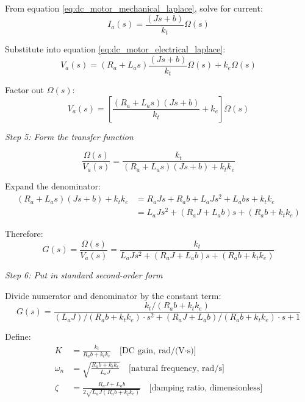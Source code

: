 \begin{example}
From equation \eqref{eq:dc_motor_mechanical_laplace}, solve for current:
\begin{equation}
I_a(s) = \frac{(Js + b)}{k_t} \Omega(s)
\end{equation}

Substitute into equation \eqref{eq:dc_motor_electrical_laplace}:
\begin{equation}
V_a(s) = (R_a + L_a s) \frac{(Js + b)}{k_t} \Omega(s) + k_e \Omega(s)
\end{equation}

Factor out $\Omega(s)$:
\begin{equation}
V_a(s) = \left[\frac{(R_a + L_a s)(Js + b)}{k_t} + k_e\right] \Omega(s)
\end{equation}

\textit{Step 5: Form the transfer function}

\begin{equation}
\frac{\Omega(s)}{V_a(s)} = \frac{k_t}{(R_a + L_a s)(Js + b) + k_t k_e}
\end{equation}

Expand the denominator:
\begin{align}
(R_a + L_a s)(Js + b) + k_t k_e &= R_a J s + R_a b + L_a J s^2 + L_a b s + k_t k_e \\
&= L_a J s^2 + (R_a J + L_a b)s + (R_a b + k_t k_e)
\end{align}

Therefore:
\begin{equation}
G(s) = \frac{\Omega(s)}{V_a(s)} = \frac{k_t}{L_a J s^2 + (R_a J + L_a b)s + (R_a b + k_t k_e)}
\end{equation}

\textit{Step 6: Put in standard second-order form}

Divide numerator and denominator by the constant term:
\begin{equation}
G(s) = \frac{k_t/(R_a b + k_t k_e)}{(L_a J)/(R_a b + k_t k_e) \cdot s^2 + (R_a J + L_a b)/(R_a b + k_t k_e) \cdot s + 1}
\end{equation}

Define:
\begin{align}
K &= \frac{k_t}{R_a b + k_t k_e} \quad \text{[DC gain, rad/(V·s)]} \\
\omega_n &= \sqrt{\frac{R_a b + k_t k_e}{L_a J}} \quad \text{[natural frequency, rad/s]} \\
\zeta &= \frac{R_a J + L_a b}{2\sqrt{L_a J(R_a b + k_t k_e)}} \quad \text{[damping ratio, dimensionless]}
\end{align}


\end{example}
